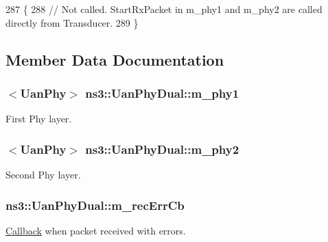 \begin{DoxyCode}
287 \{
288   \textcolor{comment}{// Not called.  StartRxPacket in m\_phy1 and m\_phy2 are called directly from Transducer.}
289 \}
\end{DoxyCode}


\subsection{Member Data Documentation}
\subsubsection[{\texorpdfstring{m\+\_\+phy1}{m_phy1}}]{$<${\bf Uan\+Phy}$>$ ns3\+::\+Uan\+Phy\+Dual\+::m\+\_\+phy1\hspace{0.3cm}{\ttfamily [private]}}\hypertarget{classns3_1_1UanPhyDual_a044538c53fd54f356f33acf4957ab1e3}{}\label{classns3_1_1UanPhyDual_a044538c53fd54f356f33acf4957ab1e3}
First Phy layer. 
\subsubsection[{\texorpdfstring{m\+\_\+phy2}{m_phy2}}]{$<${\bf Uan\+Phy}$>$ ns3\+::\+Uan\+Phy\+Dual\+::m\+\_\+phy2\hspace{0.3cm}{\ttfamily [private]}}\hypertarget{classns3_1_1UanPhyDual_a36497239aebc68ce6e20f166ab0fefc7}{}\label{classns3_1_1UanPhyDual_a36497239aebc68ce6e20f166ab0fefc7}
Second Phy layer. 
\subsubsection[{\texorpdfstring{m\+\_\+rec\+Err\+Cb}{m_recErrCb}}]{ ns3\+::\+Uan\+Phy\+Dual\+::m\+\_\+rec\+Err\+Cb\hspace{0.3cm}{\ttfamily [private]}}\hypertarget{classns3_1_1UanPhyDual_ac793e3b99f1842b5ea35554380d23f38}{}\label{classns3_1_1UanPhyDual_ac793e3b99f1842b5ea35554380d23f38}
\hyperlink{classns3_1_1Callback}{Callback} when packet received with errors. 
